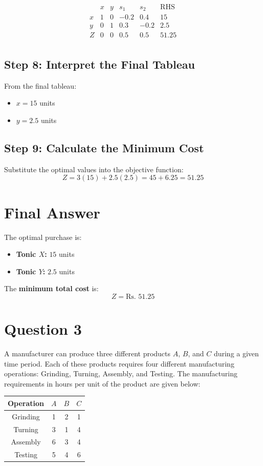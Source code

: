 \documentclass{article}
\begin{document}
\[
\begin{array}{cccccc|c}
 & x & y & s_1 & s_2 & \text{RHS} \\
\hline
x & 1 & 0 & -0.2 & 0.4 & 15 \\
y & 0 & 1 & 0.3 & -0.2 & 2.5 \\
\hline
Z & 0 & 0 & 0.5 & 0.5 & 51.25 \\
\end{array}
\]

\subsection*{Step 8: Interpret the Final Tableau}
From the final tableau:
\begin{itemize}
    \item \( x = 15 \) units
    \item \( y = 2.5 \) units
\end{itemize}

\subsection*{Step 9: Calculate the Minimum Cost}
Substitute the optimal values into the objective function:
\[
Z = 3(15) + 2.5(2.5) = 45 + 6.25 = 51.25
\]

\section*{Final Answer}
The optimal purchase is:
\begin{itemize}
    \item \textbf{Tonic \( X \):} \( 15 \) units
    \item \textbf{Tonic \( Y \):} \( 2.5 \) units
\end{itemize}

The \textbf{minimum total cost} is:
\[
Z = \text{Rs. } 51.25
\]

\newpage
\section*{Question 3}
A manufacturer can produce three different products \( A \), \( B \), and \( C \) during a given time period. Each of these products requires four different manufacturing operations: Grinding, Turning, Assembly, and Testing. The manufacturing requirements in hours per unit of the product are given below:

\begin{center}
\begin{tabular}{|c|c|c|c|}
\hline
Operation & \( A \) & \( B \) & \( C \) \\
\hline
Grinding  & 1        & 2        & 1        \\
Turning   & 3        & 1        & 4        \\
Assembly  & 6        & 3        & 4        \\
Testing   & 5        & 4        & 6        \\
\hline
\end{tabular}
\end{center}
\end{document}
